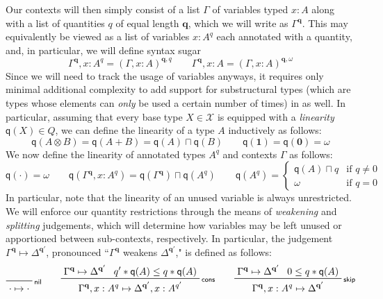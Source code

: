 \documentclass[acmsmall,screen,review]{acmart}
\newcommand{\mc}[1]{\ensuremath{\mathcal{#1}}}
\newcommand{\mb}[1]{\ensuremath{\mathbf{#1}}}
\newcommand{\ms}[1]{\ensuremath{\mathsf{#1}}}
\newcommand{\cwk}[2]{#1 \mapsto #2}
\newcommand{\rle}[1]{{\scriptsize\textsf{#1}}}
\newcommand{\zeroq}{0}
\newcommand{\topq}{\omega}
\newcommand{\alquant}{\ms{q}}
\begin{document}
Our contexts will then simply
consist of a list $\Gamma$ of variables typed $x : A$ along with a list of quantities $q$ of equal
length $\mb{q}$, which we will write as $\Gamma^{\mb{q}}$. This may equivalently be viewed as a list
of variables $x : A^q$ each annotated with a quantity, and, in particular, we will define syntax
sugar
\begin{equation}
  \Gamma^{\mb{q}}, x : A^q = (\Gamma, x : A)^{\mb{q}, q} \qquad
  \Gamma^{\mb{q}}, x : A =  (\Gamma, x : A)^{\mb{q}, \topq}
\end{equation}
Since we will need to track the usage of variables anyways, it requires only minimal additional
complexity to add support for substructural types (which are types whose elements can \emph{only} be used a
certain number of times) in as well. In particular, assuming that every base type $X \in \mc{X}$ is
equipped with a \emph{linearity} $\alquant(X) \in Q$, we can define the linearity of a type $A$
inductively as follows:
\begin{equation}
  \alquant(A \otimes B) = \alquant(A + B) = \alquant(A) \sqcap \alquant(B) \qquad
  \alquant(\mb{1}) = \alquant(\mb{0}) = \topq
\end{equation}
We now define the linearity of annotated types $A^q$ and contexts $\Gamma$ as follows:
\begin{equation}
  \alquant(\cdot) = \topq \qquad
  \alquant(\Gamma^{\mb{q}}, x : A^q) 
    = \alquant(\Gamma^{\mb{q}}) \sqcap \alquant(A^q) \qquad 
  \alquant(A^q) = \begin{cases}
    \alquant(A) \sqcap q & \text{if } q \neq 0 \\
    \topq & \text{if } q = 0
  \end{cases}
\end{equation}
In particular, note that the linearity of an unused variable is always unrestricted.
%
We will enforce our quantity restrictions through the means of \emph{weakening} and \emph{splitting}
judgements, which will determine how variables may be left unused or apportioned between
sub-contexts, respectively. In particular, the judgement $\cwk{\Gamma^{\mb{q}}}{\Delta^{\mb{q}'}}$,
pronounced ``$\Gamma^{\mb{q}}$ weakens $\Delta^{\mb{q'}}$," is defined as follows:
\begin{gather*}
  \prftree[r]{\rle{nil}}{\cwk{\cdot}{\cdot}} \qquad 
  \prftree[r]{\rle{cons}}
    {\cwk{\Gamma^{\mb{q}}}{\Delta^{\mb{q}'}}}
    {q' * \alquant(A) \leq q * \alquant(A)}
    {\cwk{\Gamma^{\mb{q}}, x : A^q}
         {\Delta^{\mb{q}'}, x : A^{q'}}} \qquad
  \prftree[r]{\rle{skip}}
    {\cwk{\Gamma^{\mb{q}}}{\Delta^{\mb{q}'}}}
    {\zeroq \leq q * \alquant(A)}
    {\cwk{\Gamma^{\mb{q}}, x : A^q}{\Delta}^{\mb{q}'}}
\end{gather*}
\end{document}
